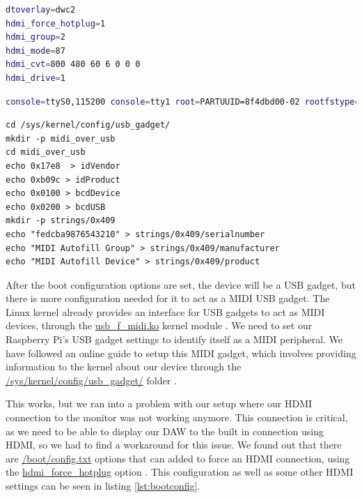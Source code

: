 \begin{minipage}{\linewidth}

  \begin{lstlisting}[language=bash,
  label={lst:bootconfig},
  caption=Lines added to /boot/config.txt \autocite{raspberryPiGadgetSetup, raspberryPiHDMIFix}]
dtoverlay=dwc2
hdmi_force_hotplug=1
hdmi_group=2
hdmi_mode=87
hdmi_cvt=800 480 60 6 0 0 0
hdmi_drive=1
  \end{lstlisting}

  \begin{lstlisting}[language=bash, label={lst:bootcmdline}, caption=DietPi /boot/cmdline.txt modified to allow a USB Gadget \autocite{raspberryPiGadgetSetup}, breaklines=true]
console=ttyS0,115200 console=tty1 root=PARTUUID=8f4dbd00-02 rootfstype=ext4 elevator=deadline fsck.repair=yes rootwait quiet net.ifnames=0 modules-load=dwc2,g_ether
  \end{lstlisting}

  \begin{lstlisting}[label={lst:usb_gadget}, caption=Bash procedure to setup a MIDI Gadget\, modified for our device \autocite{raspberryPiGadgetSetup}, breaklines=true]
cd /sys/kernel/config/usb_gadget/
mkdir -p midi_over_usb
cd midi_over_usb
echo 0x17e8  > idVendor
echo 0xb09c > idProduct
echo 0x0100 > bcdDevice
echo 0x0200 > bcdUSB
mkdir -p strings/0x409
echo "fedcba9876543210" > strings/0x409/serialnumber
echo "MIDI Autofill Group" > strings/0x409/manufacturer
echo "MIDI Autofill Device" > strings/0x409/product
  \end{lstlisting}

\end{minipage}

After the boot configuration options are set, the device will be a USB gadget, but there
is more configuration needed for it to act as a MIDI USB gadget. The Linux kernel already
provides an interface for USB gadgets to act as MIDI devices, through the
\url{usb_f_midi.ko} kernel module \autocite{usbGadgetDocumentation}. We need to set our
Raspberry Pi's USB gadget settings to identify itself as a MIDI peripheral. We have
followed an online guide to setup this MIDI gadget, which involves providing information
to the kernel about our device through the \url{/sys/kernel/config/usb_gadget/} folder
\autocite{raspberryPiGadgetSetup}.

This works, but we ran into a problem with our setup where our HDMI connection to the
monitor was not working anymore. This connection is critical, as we need to be able to
display our DAW to the built in connection using HDMI, so we had to find a workaround for
this issue. We found out that there are \url{/boot/config.txt} options that can added to
force an HDMI connection, using the \url{hdmi_force_hotplug} option
\autocite{raspberryPiHDMIFix}. This configuration as well as some other HDMI settings can
be seen in listing \ref{lst:bootconfig}.


